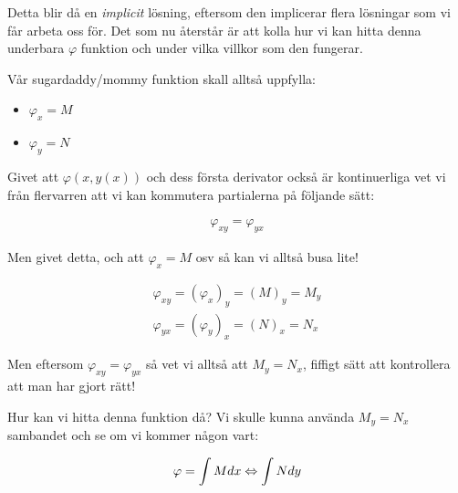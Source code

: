 \noindent Detta blir då en \textit{implicit} lösning, eftersom den implicerar flera lösningar som vi får arbeta oss för. Det som nu återstår är att kolla hur vi kan hitta denna underbara $\varphi$ funktion och under vilka villkor som den fungerar.
\par\bigskip
\pagebreak
\noindent Vår sugardaddy/mommy funktion skall alltså uppfylla:

\begin{itemize}
  \item $\varphi_x=M$
  \item $\varphi_y=N$
\end{itemize}
\par\bigskip

\noindent Givet att $\varphi(x,y(x))$ och dess första derivator också är kontinuerliga vet vi från flervarren att vi kan kommutera partialerna på följande sätt:
\par\bigskip

\begin{equation*}
  \begin{gathered}
    \varphi_{x y}=\varphi_{y x}
  \end{gathered}
\end{equation*}
\par\bigskip

\noindent Men givet detta, och att $\varphi_x=M$ osv så kan vi alltså busa lite!

\begin{equation*}
  \begin{gathered}
    \varphi_{x y} = (\varphi_x)_y=(M)_y=M_y\\
    \varphi_{y x}=(\varphi_y)_x=(N)_x=N_x
  \end{gathered}
\end{equation*}
\par\bigskip

\noindent Men eftersom $\varphi_{x y}=\varphi_{y x}$ så vet vi alltså att $M_y=N_x$, fiffigt sätt att kontrollera att man har gjort rätt!
\par\bigskip

\noindent Hur kan vi hitta denna funktion då? Vi skulle kunna använda $M_y=N_x$ sambandet och se om vi kommer någon vart:


\begin{equation*}
  \begin{gathered}
    \varphi = \int M dx \Leftrightarrow \int N dy
  \end{gathered}
\end{equation*}
\par\bigskip

